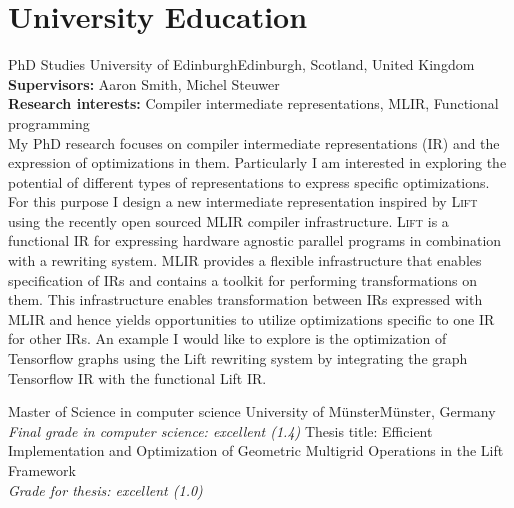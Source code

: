 \documentclass[11pt,a4paper,sans]{moderncv}        %
\newcommand{\Lift}{\textsc{Lift}\xspace}
\begin{document}
\section{University Education}
					{PhD Studies}
                    {University of Edinburgh}{Edinburgh, Scotland, United Kingdom}{}
                    {\textbf{Supervisors:} Aaron Smith, Michel Steuwer \\
                    \textbf{Research interests:} Compiler intermediate representations, MLIR, Functional programming \\
                    My PhD research focuses on compiler intermediate representations (IR) and the expression of optimizations in them. Particularly I am interested in exploring the potential of different types of representations to express specific optimizations. For this purpose I design a new intermediate representation inspired by \Lift using the recently open sourced MLIR compiler infrastructure. \Lift is a functional IR for expressing hardware agnostic parallel programs in combination with a rewriting system. MLIR provides a flexible infrastructure that enables specification of IRs and contains a toolkit for performing transformations on them. This infrastructure enables transformation between IRs expressed with MLIR and hence yields opportunities to utilize optimizations specific to one IR for other IRs. An example I would like to explore is the optimization of Tensorflow graphs using the Lift rewriting system by integrating the graph Tensorflow IR with the functional Lift IR.%
                    }


					{Master of Science in computer science}
					{University of Münster}{Münster, Germany}
                    {\textit{Final grade in computer science: excellent (1.4)}}
					{Thesis title: Efficient Implementation and Optimization of Geometric Multigrid Operations in the Lift Framework \\
					 \textit{Grade for thesis: excellent (1.0)}
					}
\end{document}
